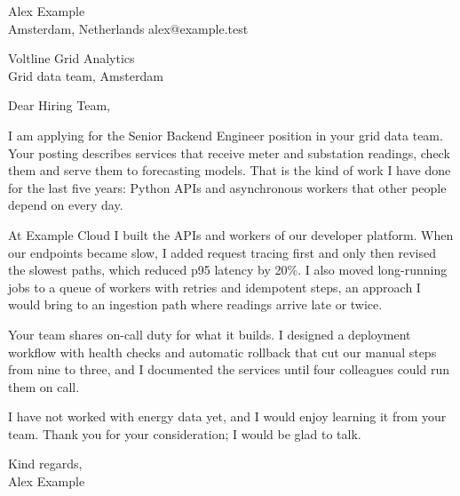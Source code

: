 \documentclass[11pt,a4paper]{article}
\begin{document}
{\large Alex Example}\\
Amsterdam, Netherlands \textperiodcentered{} alex@example.test
\bigskip

Voltline Grid Analytics\\
Grid data team, Amsterdam

Dear Hiring Team,

I am applying for the Senior Backend Engineer position in your grid data team.
Your posting describes services that receive meter and substation readings,
check them and serve them to forecasting models. That is the kind of work I have
done for the last five years: Python APIs and asynchronous workers that other
people depend on every day.

At Example Cloud I built the APIs and workers of our developer platform. When
our endpoints became slow, I added request tracing first and only then revised
the slowest paths, which reduced p95 latency by 20\%. I also moved long-running
jobs to a queue of workers with retries and idempotent steps, an approach I would
bring to an ingestion path where readings arrive late or twice.

Your team shares on-call duty for what it builds. I designed a deployment
workflow with health checks and automatic rollback that cut our manual steps from
nine to three, and I documented the services until four colleagues could run
them on call.

I have not worked with energy data yet, and I would enjoy learning it from your
team. Thank you for your consideration; I would be glad to talk.

Kind regards,\\
Alex Example
\end{document}
